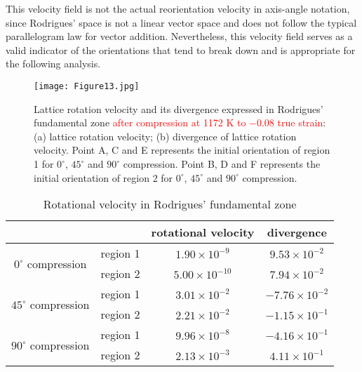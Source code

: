 \documentclass[review]{elsarticle}
\begin{document}
This velocity field is not the actual reorientation velocity in axis-angle notation, since Rodrigues' space is not a linear vector space and does not follow the typical parallelogram law for vector addition.
Nevertheless, this velocity field serves as a valid indicator of the orientations that tend to break down and is appropriate for the following analysis.
%
%
\begin{figure}[!htb]
\centering
\texttt{[image: Figure13.jpg]}
\caption{\label{fig:13}Lattice rotation velocity and its divergence expressed in Rodrigues' fundamental zone \textcolor{red}{after compression at 1172 K to $-0.08$ true strain}:
(a) lattice rotation velocity;
(b) divergence of lattice rotation velocity.
Point A, C and E represents the initial orientation of region 1 for $0^{\circ}$, $45^{\circ}$ and $90^{\circ}$ compression.
Point B, D and F represents the initial orientation of region 2 for $0^{\circ}$, $45^{\circ}$ and $90^{\circ}$ compression.}
\end{figure}
%
%	
\begin{table}[!htb]
\centering
\caption{\label{table:div}Rotational velocity in Rodrigues' fundamental zone}
\begin{tabular}{c c c c}
\hline
\,&\,&rotational velocity&divergence\\
\hline
\multirow{2}{1in}{$0^{\circ}$ compression}&region 1&$1.90\times 10^{-9}$&$9.53\times 10^{-2}$\\
&region 2&$5.00\times 10^{-10}$&$7.94\times 10^{-2}$\\
\multirow{2}{1in}{$45^{\circ}$ compression}&region 1&$3.01\times 10^{-2}$&$-7.76\times 10^{-2}$\\
&region 2&$2.21\times 10^{-2}$&$-1.15\times 10^{-1}$\\
\multirow{2}{1in}{$90^{\circ}$ compression}&region 1&$9.96\times 10^{-8}$&$-4.16\times 10^{-1}$\\
&region 2&$2.13\times 10^{-3}$&$4.11\times 10^{-1}$\\
\hline
\end{tabular}
\end{table}
\end{document}
